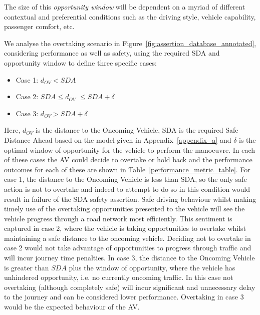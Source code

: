 The size of this \emph{opportunity window} will be dependent on a myriad of different contextual and preferential conditions such as the driving style, vehicle capability, passenger comfort, etc. 

We analyse the overtaking scenario in Figure~\ref{fig:assertion_database_annotated}, considering performance as well as safety, using the required SDA and opportunity window to define three specific cases:
\begin{itemize}

    \item Case 1: $d_{OV} < SDA$
    \item Case 2: $SDA \leq d_{OV}$ $\leq SDA + \delta$
    \item Case 3: $d_{OV} > SDA + \delta$
\end{itemize}
%
Here, $d_{OV}$ is the distance to the Oncoming Vehicle, SDA is the required Safe Distance Ahead based on the model given in Appendix~\ref{appendix_a} and $\delta$ is the optimal window of opportunity for the vehicle to perform the manoeuvre. 
%
In each of these cases the AV could decide to overtake or hold back and the performance outcomes for each of these are shown in Table~\ref{performance_metric_table}. 
%
For case 1, the distance to the Oncoming Vehicle is less than SDA, so the only safe action is not to overtake and indeed to attempt to do so in this condition would result in failure of the SDA safety assertion. Safe driving behaviour whilst making timely use of the overtaking opportunities presented to the vehicle will see the vehicle progress through a road network most efficiently. This sentiment is captured in case 2, where the vehicle is taking opportunities to overtake whilst maintaining a safe distance to the oncoming vehicle. Deciding not to overtake in case 2 would not take advantage of opportunities to progress through traffic and will incur journey time penalties. In case 3, the distance to the Oncoming Vehicle is greater than $SDA$ plus the window of opportunity, where the vehicle has unhindered opportunity, i.e. no currently oncoming traffic. In this case not overtaking (although completely safe) will incur significant and unnecessary delay to the journey and can be considered lower performance. Overtaking in case 3 would be the expected behaviour of the AV. %
%

